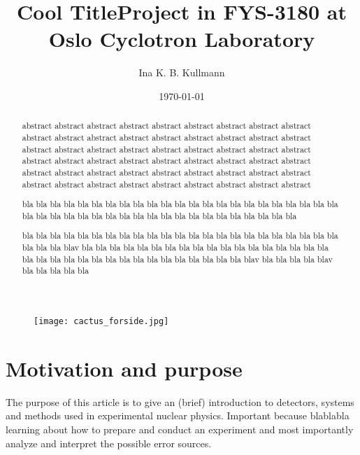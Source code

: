 \documentclass[11pt,a4wide]{article}
\title{{\Huge {\bf Cool Title}}\linebreak \linebreak \small{Project in FYS-3180 at} \linebreak \Large{ Oslo Cyclotron Laboratory}  }
\author{Ina K. B. Kullmann}
\date{\today}
\begin{document}
\maketitle

\begin{abstract}
abstract abstract abstract abstract abstract abstract abstract abstract abstract abstract abstract abstract abstract abstract abstract abstract abstract abstract abstract abstract abstract abstract abstract abstract abstract abstract abstract abstract abstract abstract abstract abstract abstract abstract abstract abstract abstract abstract abstract abstract abstract abstract abstract abstract abstract abstract abstract abstract abstract abstract abstract abstract abstract abstract 

bla bla bla bla bla bla bla bla bla bla bla bla bla bla bla bla bla bla bla bla bla bla bla bla bla bla bla bla bla bla bla bla bla bla bla bla bla bla bla bla bla bla bla 

bla bla bla bla bla bla bla bla bla bla bla bla bla bla bla bla bla bla bla bla bla bla bla bla bla bla blav bla bla bla bla bla bla bla bla bla bla bla bla bla bla bla bla bla bla bla bla bla bla bla bla bla bla bla bla bla bla bla bla bla bla blav bla bla bla bla blav bla bla bla bla bla
\end{abstract}

\begin{figure}[htp]
\centering
\texttt{[image: cactus\_forside.jpg]}
\label{fig:front_page}
\end{figure}

\newpage

\tableofcontents
\newpage

\section{Motivation and purpose}

The purpose of this article is to give an (brief) introduction to detectors, systems and methods used in experimental nuclear physics. Important because blablabla learning about how to prepare and conduct an experiment and most importantly analyze and interpret the possible error sources.
\end{document}
